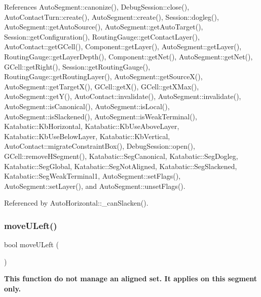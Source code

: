 References Auto\+Segment\+::canonize(), Debug\+Session\+::close(), Auto\+Contact\+Turn\+::create(), Auto\+Segment\+::create(), Session\+::dogleg(), Auto\+Segment\+::get\+Auto\+Source(), Auto\+Segment\+::get\+Auto\+Target(), Session\+::get\+Configuration(), Routing\+Gauge\+::get\+Contact\+Layer(), Auto\+Contact\+::get\+G\+Cell(), Component\+::get\+Layer(), Auto\+Segment\+::get\+Layer(), Routing\+Gauge\+::get\+Layer\+Depth(), Component\+::get\+Net(), Auto\+Segment\+::get\+Net(), G\+Cell\+::get\+Right(), Session\+::get\+Routing\+Gauge(), Routing\+Gauge\+::get\+Routing\+Layer(), Auto\+Segment\+::get\+Source\+X(), Auto\+Segment\+::get\+Target\+X(), G\+Cell\+::get\+X(), G\+Cell\+::get\+X\+Max(), Auto\+Segment\+::get\+Y(), Auto\+Contact\+::invalidate(), Auto\+Segment\+::invalidate(), Auto\+Segment\+::is\+Canonical(), Auto\+Segment\+::is\+Local(), Auto\+Segment\+::is\+Slackened(), Auto\+Segment\+::is\+Weak\+Terminal(), Katabatic\+::\+Kb\+Horizontal, Katabatic\+::\+Kb\+Use\+Above\+Layer, Katabatic\+::\+Kb\+Use\+Below\+Layer, Katabatic\+::\+Kb\+Vertical, Auto\+Contact\+::migrate\+Constraint\+Box(), Debug\+Session\+::open(), G\+Cell\+::remove\+H\+Segment(), Katabatic\+::\+Seg\+Canonical, Katabatic\+::\+Seg\+Dogleg, Katabatic\+::\+Seg\+Global, Katabatic\+::\+Seg\+Not\+Aligned, Katabatic\+::\+Seg\+Slackened, Katabatic\+::\+Seg\+Weak\+Terminal1, Auto\+Segment\+::set\+Flags(), Auto\+Segment\+::set\+Layer(), and Auto\+Segment\+::unset\+Flags().



Referenced by Auto\+Horizontal\+::\+\_\+can\+Slacken().

\mbox{\label{classKatabatic_1_1AutoHorizontal_a1fa2421b74bf0eb934b7002fd3da2321}} 
\subsubsection{\texorpdfstring{move\+U\+Left()}{moveULeft()}}
{\footnotesize\ttfamily bool move\+U\+Left (\begin{DoxyParamCaption}{ }\end{DoxyParamCaption})\hspace{0.3cm}{\ttfamily [virtual]}}

{\bfseries This function do not manage an aligned set. It applies on {\ttfamily this} segment only.}

